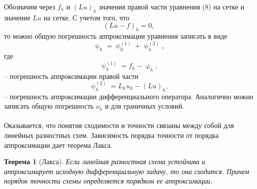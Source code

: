 \documentclass[a4paper, 12pt]{report}
\numberwithin{equation}{section}
\renewcommand{\varphi}{\upvarphi}
\renewcommand{\psi}{\uppsi}
\newtheorem*{theorem}{Теорема}
\begin{document}
	Обозначим через $f_h$ и $(Lu)_h$ значения правой части уравнения (8) на сетке и значение $Lu$ на сетке. С учетом того, что 
	$$(Lu - f)_h = 0,$$
	то можно общую погрешность аппроксимации уравнения записать в виде
	\begin{equation}
		\psi_h = \psi_h^{(1)} + \psi_h^{(2)},
	\end{equation}
	где
	$$\psi_h^{(1)} = f_h - \varphi_h,$$ -- погрешность аппроксимации правой части
	$$\psi_h^{(2)} = L_h u_h - (Lu)_h,$$ -- погрешность аппроксимации дифференциального оператора. Аналогично можно записать общую погрешность $\nu_h$ и для граничных условий.\\\\
	Оказывается, что понятия сходимости и точности связаны между собой для линейных разностных схем. Зависимость порядка точности от порядка аппроксимации дает теорема Лакса.
	\begin{theorem}
		[Лакса] Если линейная разностная схема устойчива и аппроксимирует исходную дифференциальную задачу, то она сходится. Причем порядок точности схемы определяется порядком ее аппроксимации.
	\end{theorem}
\end{document}
